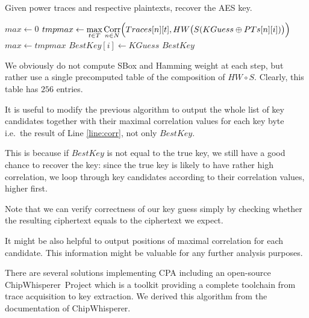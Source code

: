 	\begin{alg}
	\label{alg:cpa}
	Given power traces and respective plaintexts, recover the AES key.
		\begin{algorithmic}[1]
					\State $max \gets 0$
						\State $tmpmax \gets \max\limits_{t\in T} \operatorname*{Corr}\limits_{n\in N}\Bigl(Traces[n][t], HW\bigl(S(KGuess\oplus PTs[n][i])\bigr)\Bigr)$
							\label{line:corr}
							\State $max \gets tmpmax$
							\State $BestKey[i] \gets KGuess$
						\EndIf
					\EndFor
				\EndFor
				\State\Return $BestKey$
			\EndFunction
		\end{algorithmic}
	\end{alg}
	
	\begin{remark}
	\label{rem:attacklookup}
		We obviously do not compute SBox and Hamming weight at each step, but rather use a single precomputed table of the composition of $HW\circ S$. Clearly, this table has $256$ entries.
	\end{remark}
	
	\begin{note}
	\label{note:fulllist}
		It is useful to modify the previous algorithm to output the whole list of key candidates together with their maximal correlation values for each key byte i.e.\ the result of Line \ref{line:corr}, not only $BestKey$.
		
		This is because if $BestKey$ is not equal to the true key, we still have a good chance to recover the key: since the true key is likely to have rather high correlation, we loop through key candidates according to their correlation values, higher first.
		
		Note that we can verify correctness of our key guess simply by checking whether the resulting ciphertext equals to the ciphertext we expect.
	\end{note}
	
	\begin{note}
	\label{note:leakpos}
		It might be also helpful to output positions of maximal correlation for each candidate. This information might be valuable for any further analysis purposes.
	\end{note}
	
	There are several solutions implementing CPA including an open-source ChipWhisperer\texttrademark\ Project \cite{chipwhisperer} which is a toolkit providing a complete toolchain from trace acquisition to key extraction. We derived this algorithm from the documentation of ChipWhisperer\texttrademark.


